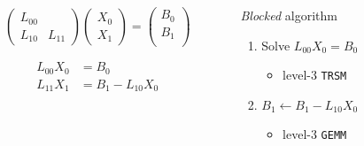 \documentclass[xcolor={rgb,x11names,svgnames},rgb,x11names,svgnames]{beamer}
\begin{document}
\begin{frame}[label=trsm]
\begin{center}
    \end{center}
    
  \begin{columns}
    \begin{column}{5cm}
\[
     \begin{pmatrix}
       L_{00} &  \\
       L_{10} & L_{11} 
     \end{pmatrix}
     \begin{pmatrix}
       X_{0} \\
       X_{1}  
     \end{pmatrix}
     =
     \begin{pmatrix}
     B_{0} \\
     B_{1} \\
   \end{pmatrix}
 \]

   \vspace{-0.5cm}
   
   \begin{align*}     
     L_{00} X_{0} &= B_{0} \\
     L_{11} X_1 &= B_{1} - L_{10} X_{0}
   \end{align*}
      
    \end{column}
    \begin{column}{5.5cm}

 \begin{block}{\emph{Blocked} algorithm}
   \begin{enumerate}
   \item<3-> Solve $L_{00} X_{0} = B_{0}$
     \begin{itemize}
     \item level-3 \texttt{TRSM}
     \end{itemize}

   \item<5-> $B_{1} \gets B_{1} - L_{10} X_{0}$
     \begin{itemize}
     \item level-3 \texttt{GEMM}
     \end{itemize}
     

\end{enumerate}
\end{block}
\end{column}
\end{columns}
\end{frame}
\end{document}
